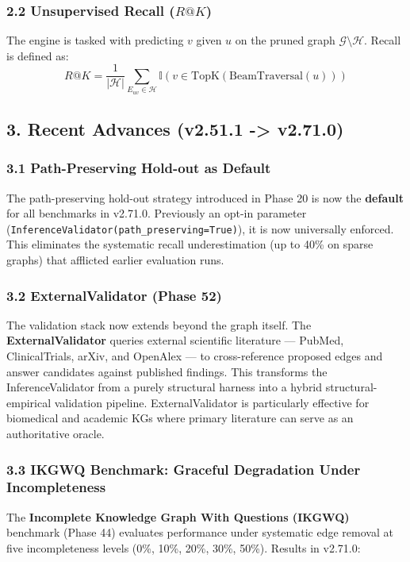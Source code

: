 \subsubsection*{2.2 Unsupervised Recall ($R@K$)}
The engine is tasked with predicting $v$ given $u$ on the pruned graph $\mathcal{G} \setminus \mathcal{H}$. Recall is defined as:
$$R@K = \frac{1}{|\mathcal{H}|} \sum_{E_{uv} \in \mathcal{H}} \mathbb{I}(v \in \text{TopK}(\text{BeamTraversal}(u)))$$

\subsection*{3. Recent Advances (v2.51.1 -> v2.71.0)}

\subsubsection*{3.1 Path-Preserving Hold-out as Default}
The path-preserving hold-out strategy introduced in Phase 20 is now the \textbf{default} for all benchmarks in v2.71.0. Previously an opt-in parameter (\texttt{InferenceValidator(path\_preserving=True)}), it is now universally enforced. This eliminates the systematic recall underestimation (up to 40\% on sparse graphs) that afflicted earlier evaluation runs.

\subsubsection*{3.2 ExternalValidator (Phase 52)}
The validation stack now extends beyond the graph itself. The \textbf{ExternalValidator} queries external scientific literature --- PubMed, ClinicalTrials, arXiv, and OpenAlex --- to cross-reference proposed edges and answer candidates against published findings. This transforms the InferenceValidator from a purely structural harness into a hybrid structural-empirical validation pipeline. ExternalValidator is particularly effective for biomedical and academic KGs where primary literature can serve as an authoritative oracle.

\subsubsection*{3.3 IKGWQ Benchmark: Graceful Degradation Under Incompleteness}
The \textbf{Incomplete Knowledge Graph With Questions (IKGWQ)} benchmark (Phase 44) evaluates performance under systematic edge removal at five incompleteness levels (0\%, 10\%, 20\%, 30\%, 50\%). Results in v2.71.0:

